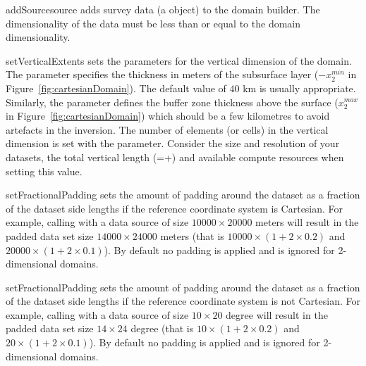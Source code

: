 \begin{methoddesc}[DomainBuilder]{addSource}{source}
adds survey data  (a  object) to the domain
builder. The dimensionality of the data must be less than or equal to the
domain dimensionality.
\end{methoddesc}

\begin{methoddesc}[DomainBuilder]{setVerticalExtents}{%
%
%
}
sets the parameters for the vertical dimension of the domain. The parameter
 specifies the thickness in meters of the subsurface layer
($-x_2^{min}$ in Figure~\ref{fig:cartesianDomain}).
The default value of $40$ km is usually appropriate. Similarly, the
 parameter defines the buffer zone thickness above the surface
($x_2^{max}$ in Figure~\ref{fig:cartesianDomain}) which should be a few
kilometres to avoid artefacts in the inversion.
The number of elements (or cells) in the vertical dimension is set with the
 parameter. Consider the size and resolution of your datasets,
the total vertical length (=+) and available
compute resources when setting this value.
\end{methoddesc}

\begin{methoddesc}[DomainBuilder]{setFractionalPadding}{%
%
}
sets the amount of padding around the dataset as a fraction of the dataset side
lengths if the reference coordinate system is Cartesian. 
For example, calling  with a data source
of size $10000 \times 20000$ meters will result in the padded data set size $14000 \times 24000$ meters
(that is $10000 \times (1+2 \times 0.2)$ and $20000 \times (1+2 \times 0.1)$).
By default no padding is applied and  is ignored for 2-dimensional
domains.
\end{methoddesc}

\begin{methoddesc}[DomainBuilder]{setFractionalPadding}{%
%
}
sets the amount of padding around the dataset as a fraction of the dataset side
lengths if the reference coordinate system is not Cartesian.
For example, calling  with a data source
of size $10 \times 20$ degree will result in the padded data set size $14 \times 24$ degree
(that is $10 \times (1+2 \times 0.2)$ and $20 \times (1+2 \times 0.1)$).
By default no padding is applied and  is ignored for 2-dimensional
domains.
\end{methoddesc}

